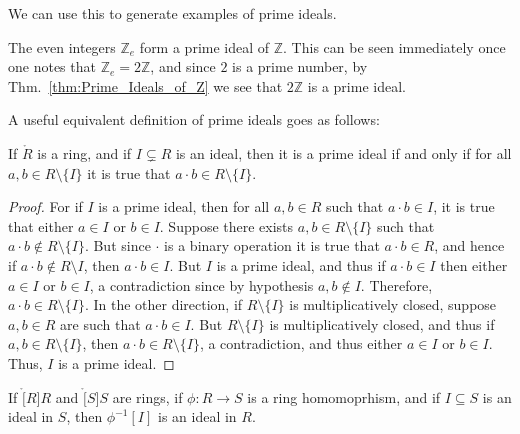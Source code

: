 \documentclass{article}                                                        %
\begin{document}
        We can use this to generate examples of prime ideals.
        \begin{example}
            The even integers $\mathbb{Z}_{e}$ form a prime ideal of
            $\mathbb{Z}$. This can be seen immediately once one notes that
            $\mathbb{Z}_{e}=2\mathbb{Z}$, and since $2$ is a prime number,
            by Thm.~\ref{thm:Prime_Ideals_of_Z} we see that $2\mathbb{Z}$ is a
            prime ideal.
        \end{example}
        A useful equivalent definition of prime ideals goes as follows:
        \begin{theorem}
            If $\ring{R}$ is a ring, and if $I\subsetneq{R}$ is an ideal, then
            it is a prime ideal if and only if for all $a,b\in{R}\setminus\{I\}$
            it is true that $a\cdot{b}\in{R}\setminus\{I\}$.
        \end{theorem}
        \begin{proof}
            For if $I$ is a prime ideal, then for all $a,b\in{R}$ such that
            $a\cdot{b}\in{I}$, it is true that either $a\in{I}$ or $b\in{I}$.
            Suppose there exists $a,b\in{R}\setminus\{I\}$ such that
            $a\cdot{b}\notin{R}\setminus\{I\}$. But since $\cdot$ is a binary
            operation it is true that $a\cdot{b}\in{R}$, and hence if
            $a\cdot{b}\notin{R}\setminus{I}$, then $a\cdot{b}\in{I}$. But $I$ is
            a prime ideal, and thus if $a\cdot{b}\in{I}$ then either $a\in{I}$
            or $b\in{I}$, a contradiction since by hypothesis $a,b\notin{I}$.
            Therefore, $a\cdot{b}\in{R}\setminus\{I\}$. In the other direction,
            if $R\setminus\{I\}$ is multiplicatively closed, suppose $a,b\in{R}$
            are such that $a\cdot{b}\in{I}$. But $R\setminus\{I\}$ is
            multiplicatively closed, and thus if $a,b\in{R}\setminus\{I\}$, then
            $a\cdot{b}\in{R}\setminus\{I\}$, a contradiction, and thus either
            $a\in{I}$ or $b\in{I}$. Thus, $I$ is a prime ideal.
        \end{proof}
        \begin{theorem}
            \label{thm:homo_pre_image_of_ideal_is_ideal}%
            If $\ring[R]{R}$ and $\ring[S]{S}$ are rings, if
            $\phi:R\rightarrow{S}$ is a ring homomoprhism, and if
            $I\subseteq{S}$ is an ideal in $S$, then $\phi^{\minus{1}}[I]$ is an
            ideal in $R$.
        \end{theorem}
\end{document}
